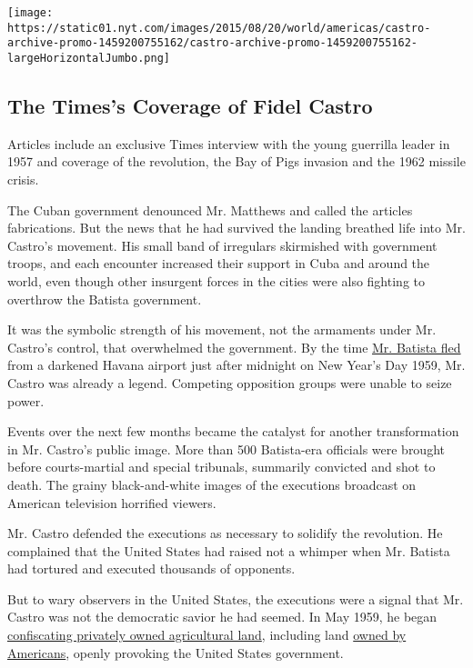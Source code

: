 \href{https://www.nytimes.com/interactive/2016/11/26/world/americas/castro-archive-promo.html}{}

\texttt{[image: https://static01.nyt.com/images/2015/08/20/world/americas/castro-archive-promo-1459200755162/castro-archive-promo-1459200755162-largeHorizontalJumbo.png]}

\hypertarget{the-timess-coverage-of-fidel-castro}{%
\subsection{The Times's Coverage of Fidel
Castro}\label{the-timess-coverage-of-fidel-castro}}

Articles include an exclusive Times interview with the young guerrilla
leader in 1957 and coverage of the revolution, the Bay of Pigs invasion
and the 1962 missile crisis.

The Cuban government denounced Mr. Matthews and called the articles
fabrications. But the news that he had survived the landing breathed
life into Mr. Castro's movement. His small band of irregulars skirmished
with government troops, and each encounter increased their support in
Cuba and around the world, even though other insurgent forces in the
cities were also fighting to overthrow the Batista government.

It was the symbolic strength of his movement, not the armaments under
Mr. Castro's control, that overwhelmed the government. By the time
\href{http://timesmachine.nytimes.com/timesmachine/1959/01/02/83432639.html?action=click\&contentCollection=Archives\&module=LedeAsset\&region=ArchiveBody\&pgtype=article\&pageNumber=1\&rpm=true}{Mr.
Batista fled} from a darkened Havana airport just after midnight on New
Year's Day 1959, Mr. Castro was already a legend. Competing opposition
groups were unable to seize power.

Events over the next few months became the catalyst for another
transformation in Mr. Castro's public image. More than 500 Batista-era
officials were brought before courts-martial and special tribunals,
summarily convicted and shot to death. The grainy black-and-white images
of the executions broadcast on American television horrified viewers.

Mr. Castro defended the executions as necessary to solidify the
revolution. He complained that the United States had raised not a
whimper when Mr. Batista had tortured and executed thousands of
opponents.

But to wary observers in the United States, the executions were a signal
that Mr. Castro was not the democratic savior he had seemed. In May
1959, he began
\href{http://timesmachine.nytimes.com/timesmachine/1959/05/14/80577418.html?action=click\&contentCollection=Archives\&module=ArticleEndCTA\&region=ArchiveBody\&pgtype=article\&pageNumber=10\&rpm=true}{confiscating
privately owned agricultural land}, including land
\href{http://query.nytimes.com/gst/abstract.html?res=9F02E5DB1F3CE63BBC4052DFB1668382649EDE}{owned
by Americans}, openly provoking the United States government.

